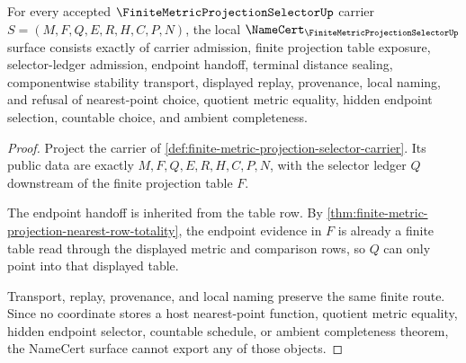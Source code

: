 \begin{theorem}
\label{thm:finite-metric-projection-selector-namecert-obligations}
For every accepted $\FiniteMetricProjectionSelectorUp$ carrier $S=(M,F,Q,E,R,H,C,P,N)$, the local $\NameCert_{\FiniteMetricProjectionSelectorUp}$ surface consists exactly of carrier admission, finite projection table exposure, selector-ledger admission, endpoint handoff, terminal distance sealing, componentwise stability transport, displayed replay, provenance, local naming, and refusal of nearest-point choice, quotient metric equality, hidden endpoint selection, countable choice, and ambient completeness.
\end{theorem}
\begin{proof}
Project the carrier of \autoref{def:finite-metric-projection-selector-carrier}. Its public data are exactly $M,F,Q,E,R,H,C,P,N$, with the selector ledger $Q$ downstream of the finite projection table $F$.

The endpoint handoff is inherited from the table row. By \autoref{thm:finite-metric-projection-nearest-row-totality}, the endpoint evidence in $F$ is already a finite table read through the displayed metric and comparison rows, so $Q$ can only point into that displayed table.

Transport, replay, provenance, and local naming preserve the same finite route. Since no coordinate stores a host nearest-point function, quotient metric equality, hidden endpoint selector, countable schedule, or ambient completeness theorem, the NameCert surface cannot export any of those objects.
\end{proof}

